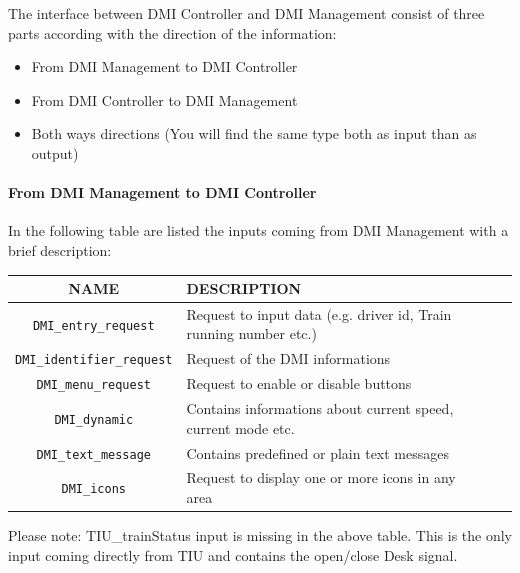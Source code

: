   The interface between DMI Controller and DMI Management consist of three parts according with the direction of the information:
  
  \begin{itemize}
  \item From DMI Management to DMI Controller
  \item From DMI Controller to DMI Management 
  \item Both ways directions (You will find the same type both as input than as output)
  \end{itemize}
  


\paragraph{From DMI Management to DMI Controller}

In the following table are listed the inputs coming from DMI Management with a brief description:\\
    \begin{tabular}{| c | l | l | l | l |}
      \hline
      \textbf{NAME} & \textbf{DESCRIPTION} \\ \hline
      \texttt{DMI\_entry\_request} & Request to input data (e.g. driver id, Train running number etc.)\\
      \texttt{DMI\_identifier\_request} & Request of the DMI informations\\
      \texttt{DMI\_menu\_request} & Request to enable or disable buttons\\
      \texttt{DMI\_dynamic} & Contains informations about current speed, current mode etc.\\
      \texttt{DMI\_text\_message} & Contains predefined or plain text messages\\
      \texttt{DMI\_icons} & Request to display one or more icons in any area\\

      \hline
    \end{tabular} 
    \label{tbl:DMICtrToDMIMng}
  
      Please note: TIU\_trainStatus input is missing in the above table. This is the only input coming directly from TIU and contains the open/close Desk signal. 
    
